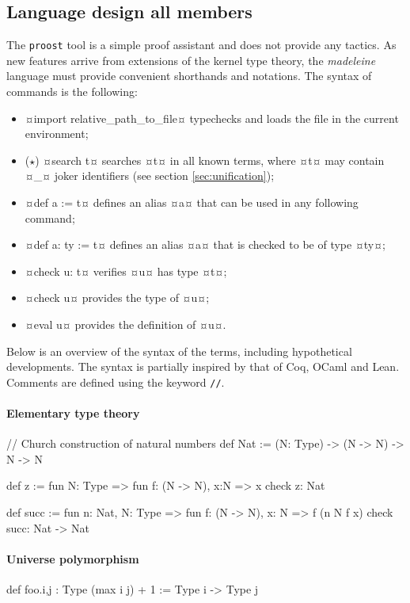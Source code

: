\documentclass[twocolumn]{article}
\newcommand{\members}[1]{\texorpdfstring{\hfill\scriptsize #1}{}}
\newcommand{\etun}{{\color{Green} ($\star$)} }
\begin{document}
\subsection{Language design \members{all members}} The \texttt{proost} tool is a
simple proof assistant and does not provide any tactics. As new features arrive
from extensions of the kernel type theory, the \emph{madeleine} language must
provide convenient shorthands and notations. The syntax of commands is the
following:
\begin{itemize}
	\item ¤import relative_path_to_file¤ typechecks
		and loads the file in the current environment;
	\item \etun ¤search t¤ searches ¤t¤ in all known terms, where ¤t¤ may contain
		¤_¤ joker identifiers (see section \ref{sec:unification});
	\item ¤def a := t¤
		defines an alias ¤a¤ that can be used in any following command;
	\item ¤def a: ty := t¤ defines an alias ¤a¤ that is checked to
		be of type ¤ty¤;
	\item ¤check u: t¤ verifies ¤u¤ has type ¤t¤;
  \item ¤check u¤ provides the type of ¤u¤;
  \item ¤eval u¤ provides the definition of ¤u¤.
\end{itemize}

Below is an overview of the syntax of the terms, including hypothetical
developments. The syntax is partially inspired by that of Coq, OCaml and Lean. Comments are
defined using the keyword \texttt{//}.

\paragraph{Elementary type theory}
\phantom{hello}
\begin{proost}
// Church construction of natural numbers
def Nat :=
  (N: Type) -> (N -> N) -> N -> N

def z := fun N: Type =>
  fun f: (N -> N), x:N => x
check z: Nat

def succ := fun n: Nat, N: Type =>
  fun f: (N -> N), x: N =>
    f (n N f x)
check succ: Nat -> Nat
\end{proost}

\paragraph{Universe polymorphism}
\phantom{hello}
\begin{proost}
def foo.{i,j} : Type (max i j) + 1
:= Type i -> Type j
\end{proost}
\end{document}
